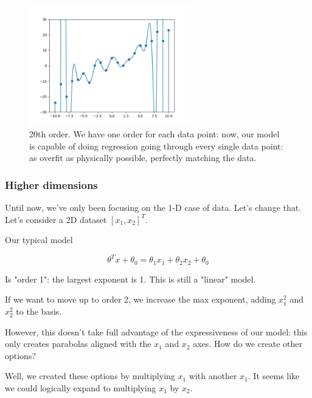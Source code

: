                  \begin{figure}[H]
                    \centering
                    
                    \includegraphics[width=70mm,scale=0.5]{images/feature_images/order_20_soln.png}
                    \caption*{20th order. We have one order for each data point: now, our model is capable of doing regression going through every single data point: as overfit as physically possible, perfectly matching the data.}
                \end{figure}

            \subsecdiv
            \subsubsection{Higher dimensions}

                Until now, we've only been focusing on the 1-D case of data. Let's change that. Let's consider a 2D dataset $[x_1,x_2]^T$.

                Our typical model

                \begin{equation}
                    \theta^Tx + \theta_0 = \theta_1x_1 + \theta_2x_2 + \theta_0
                \end{equation}

                Is "order 1": the largest exponent is 1. This is still a "linear" model. 

                If we want to move up to order 2, we increase the max exponent, adding $x_1^2$ and $x_2^2$ to the basis.

                However, this doesn't take full advantage of the expressiveness of our model: this only creates parabolas aligned with the $x_1$ and $x_2$ axes. How do we create other options?

                Well, we created these options by multiplying $x_1$ with another $x_1$. It seems like we could logically expand to multiplying $x_1$ by $x_2$.\\

